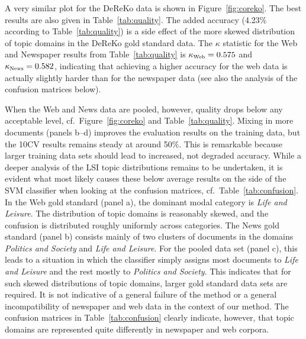 \documentclass[11pt]{article}
\begin{document}
A very similar plot for the DeReKo data is shown in Figure~\ref{fig:coreko}.
The best results are also given in Table~\ref{tab:quality}.
The added accuracy (4.23\% according to Table~\ref{tab:quality}) is a side effect of the more skewed distribution of topic domains in the DeReKo gold standard data.
The $\kappa$ statistic for the Web and Newspaper results from Table~\ref{tab:quality} is $\kappa_{\textrm{\tiny Web}}=0.575$ and $\kappa_{\textrm{\tiny News}}=0.582$, indicating that achieving a higher accuracy for the web data is actually slightly harder than for the newspaper data (see also the analysis of the confusion matrices below).

When the Web and News data are pooled, however, quality drops below any acceptable level, cf.\ Figure~\ref{fig:coreko} and Table~\ref{tab:quality}.
Mixing in more documents (panels b--d) improves the evaluation results on the training data, but the 10CV results remains steady at around 50\%.
This is remarkable because larger training data sets should lead to increased, not degraded accuracy.
While a deeper analysis of the LSI topic distributions remains to be undertaken, it is evident what most likely causes these below average results on the side of the SVM classifier when looking at the confusion matrices, cf.\ Table~\ref{tab:confusion}.
In the Web gold standard (panel a), the dominant modal category is \textit{Life and Leisure}.
The distribution of topic domains is reasonably skewed, and the confusion is distributed roughly uniformly across categories.
The News gold standard (panel b) consists mainly of two clusters of documents in the domains \textit{Politics and Society} and \textit{Life and Leisure}.
For the pooled data set (panel c), this leads to a situation in which the classifier simply assigns most documents to \textit{Life and Leisure} and the rest mostly to \textit{Politics and Society}.
This indicates that for such skewed distributions of topic domains, larger gold standard data sets are required.
It is not indicative of a general failure of the method or a general incompatibility of newspaper and web data in the context of our method.
The confusion matrices in Table~\ref{tab:confusion} clearly indicate, however, that topic domains are represented quite differently in newspaper and web corpora.
\end{document}
